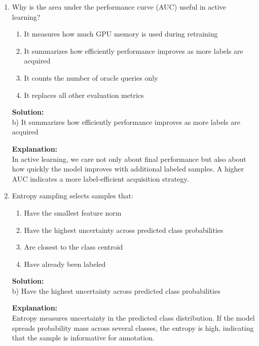 \documentclass{article}
\begin{document}
\begin{enumerate}
\textbf{Explanation:} \\
Accuracy may be misleading when one class dominates the dataset. The F1-score balances precision and recall, making it more appropriate for imbalanced classification settings.

\vspace{1em}

\item Why is the area under the performance curve (AUC) useful in active learning?

\begin{enumerate}
    \item It measures how much GPU memory is used during retraining
    \item It summarizes how efficiently performance improves as more labels are acquired
    \item It counts the number of oracle queries only
    \item It replaces all other evaluation metrics
\end{enumerate}

\textbf{Solution:} \\
b) It summarizes how efficiently performance improves as more labels are acquired

\textbf{Explanation:} \\
In active learning, we care not only about final performance but also about how quickly the model improves with additional labeled samples. A higher AUC indicates a more label-efficient acquisition strategy.

\vspace{1em}

\item Entropy sampling selects samples that:

\begin{enumerate}
    \item Have the smallest feature norm
    \item Have the highest uncertainty across predicted class probabilities
    \item Are closest to the class centroid
    \item Have already been labeled
\end{enumerate}

\textbf{Solution:} \\
b) Have the highest uncertainty across predicted class probabilities

\textbf{Explanation:} \\
Entropy measures uncertainty in the predicted class distribution. If the model spreads probability mass across several classes, the entropy is high, indicating that the sample is informative for annotation.


\end{enumerate}
\end{document}
